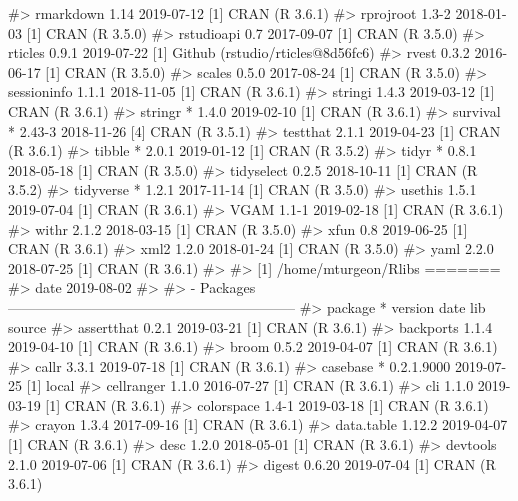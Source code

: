 \documentclass[
]{jss}
\begin{document}
\begin{CodeChunk}
\begin{CodeOutput}
#>  rmarkdown     1.14       2019-07-12 [1] CRAN (R 3.6.1)                  
#>  rprojroot     1.3-2      2018-01-03 [1] CRAN (R 3.5.0)                  
#>  rstudioapi    0.7        2017-09-07 [1] CRAN (R 3.5.0)                  
#>  rticles       0.9.1      2019-07-22 [1] Github (rstudio/rticles@8d56fc6)
#>  rvest         0.3.2      2016-06-17 [1] CRAN (R 3.5.0)                  
#>  scales        0.5.0      2017-08-24 [1] CRAN (R 3.5.0)                  
#>  sessioninfo   1.1.1      2018-11-05 [1] CRAN (R 3.6.1)                  
#>  stringi       1.4.3      2019-03-12 [1] CRAN (R 3.6.1)                  
#>  stringr     * 1.4.0      2019-02-10 [1] CRAN (R 3.6.1)                  
#>  survival    * 2.43-3     2018-11-26 [4] CRAN (R 3.5.1)                  
#>  testthat      2.1.1      2019-04-23 [1] CRAN (R 3.6.1)                  
#>  tibble      * 2.0.1      2019-01-12 [1] CRAN (R 3.5.2)                  
#>  tidyr       * 0.8.1      2018-05-18 [1] CRAN (R 3.5.0)                  
#>  tidyselect    0.2.5      2018-10-11 [1] CRAN (R 3.5.2)                  
#>  tidyverse   * 1.2.1      2017-11-14 [1] CRAN (R 3.5.0)                  
#>  usethis       1.5.1      2019-07-04 [1] CRAN (R 3.6.1)                  
#>  VGAM          1.1-1      2019-02-18 [1] CRAN (R 3.6.1)                  
#>  withr         2.1.2      2018-03-15 [1] CRAN (R 3.5.0)                  
#>  xfun          0.8        2019-06-25 [1] CRAN (R 3.6.1)                  
#>  xml2          1.2.0      2018-01-24 [1] CRAN (R 3.5.0)                  
#>  yaml          2.2.0      2018-07-25 [1] CRAN (R 3.6.1)                  
#> 
#> [1] /home/mturgeon/Rlibs
=======
#>  date     2019-08-02                  
#> 
#> - Packages --------------------------------------------------------------
#>  package     * version    date       lib source        
#>  assertthat    0.2.1      2019-03-21 [1] CRAN (R 3.6.1)
#>  backports     1.1.4      2019-04-10 [1] CRAN (R 3.6.1)
#>  broom         0.5.2      2019-04-07 [1] CRAN (R 3.6.1)
#>  callr         3.3.1      2019-07-18 [1] CRAN (R 3.6.1)
#>  casebase    * 0.2.1.9000 2019-07-25 [1] local         
#>  cellranger    1.1.0      2016-07-27 [1] CRAN (R 3.6.1)
#>  cli           1.1.0      2019-03-19 [1] CRAN (R 3.6.1)
#>  colorspace    1.4-1      2019-03-18 [1] CRAN (R 3.6.1)
#>  crayon        1.3.4      2017-09-16 [1] CRAN (R 3.6.1)
#>  data.table    1.12.2     2019-04-07 [1] CRAN (R 3.6.1)
#>  desc          1.2.0      2018-05-01 [1] CRAN (R 3.6.1)
#>  devtools      2.1.0      2019-07-06 [1] CRAN (R 3.6.1)
#>  digest        0.6.20     2019-07-04 [1] CRAN (R 3.6.1)

\end{CodeOutput}
\end{CodeChunk}
\end{document}
